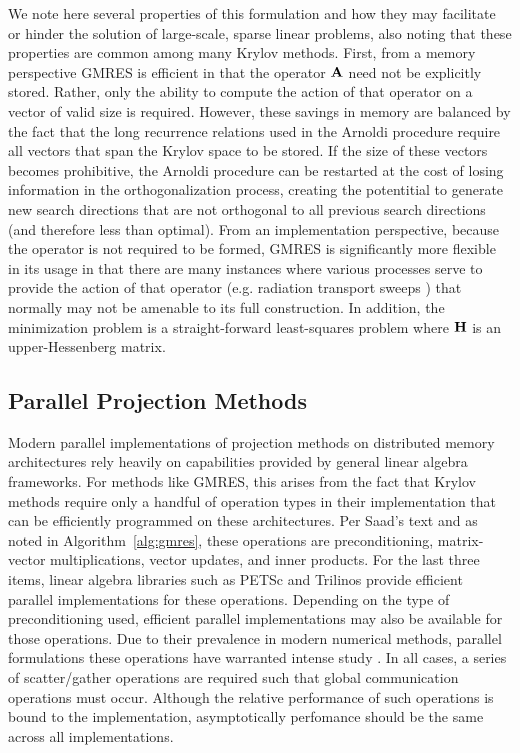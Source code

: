 We note here several properties of this formulation and how they may
facilitate or hinder the solution of large-scale, sparse linear
problems, also noting that these properties are common among many
Krylov methods. First, from a memory perspective GMRES is efficient in
that the operator $\mathbf{A}$ need not be explicitly stored. Rather, only
the ability to compute the action of that operator on a vector of
valid size is required. However, these savings in memory are balanced
by the fact that the long recurrence relations used in the Arnoldi
procedure require all vectors that span the Krylov space to be
stored. If the size of these vectors becomes prohibitive, the Arnoldi
procedure can be restarted at the cost of losing information in the
orthogonalization process, creating the potentitial to generate new
search directions that are not orthogonal to all previous search
directions (and therefore less than optimal). From an implementation
perspective, because the operator is not required to be formed, GMRES
is significantly more flexible in its usage in that there are many
instances where various processes serve to provide the action of that
operator (e.g. radiation transport sweeps \citep{evans_denovo:_2010})
that normally may not be amenable to its full construction. In
addition, the minimization problem is a straight-forward least-squares
problem where $\mathbf{H}$ is an upper-Hessenberg matrix.

\subsection{Parallel Projection Methods}
\label{subsec:parallel_krylov_methods}
Modern parallel implementations of projection methods on distributed
memory architectures rely heavily on capabilities provided by general
linear algebra frameworks. For methods like GMRES, this arises from
the fact that Krylov methods require only a handful of operation types
in their implementation that can be efficiently programmed on these
architectures. Per Saad's text \citep{saad_iterative_2003} and as
noted in Algorithm~\ref{alg:gmres}, these operations are
preconditioning, matrix-vector multiplications, vector updates, and
inner products. For the last three items, linear algebra libraries
such as PETSc \citep{gropp_scalable_1993} and Trilinos
\citep{heroux_overview_2005} provide efficient parallel
implementations for these operations. Depending on the type of
preconditioning used, efficient parallel implementations may also be
available for those operations. Due to their prevalence in modern
numerical methods, parallel formulations these operations have
warranted intense study \citep{tuminaro_parallel_1998}. In all cases, a series
of scatter/gather operations are required such that global
communication operations must occur. Although the relative performance
of such operations is bound to the implementation, asymptotically
perfomance should be the same across all implementations.

